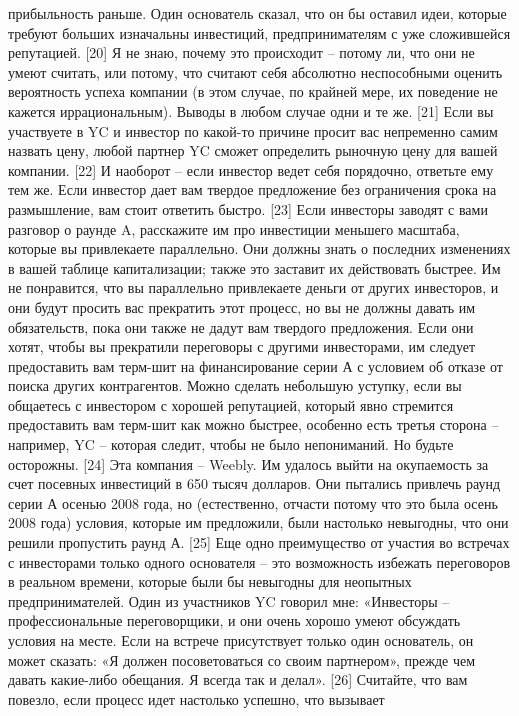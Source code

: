 \documentclass[ebook,12pt,oneside,openany]{memoir}
\begin{document}
прибыльность раньше. Один основатель сказал, что он бы оставил идеи,
которые требуют больших изначальны инвестиций, предпринимателям с уже
сложившейся репутацией. [20] Я не знаю, почему это происходит – потому
ли, что они не умеют считать, или потому, что считают себя абсолютно
неспособными оценить вероятность успеха компании (в этом случае, по
крайней мере, их поведение не кажется иррациональным). Выводы в любом
случае одни и те же. [21] Если вы участвуете в YC и инвестор по
какой-то причине просит вас непременно самим назвать цену, любой
партнер YC сможет определить рыночную цену для вашей компании. [22] И
наоборот – если инвестор ведет себя порядочно, ответьте ему тем же.
Если инвестор дает вам твердое предложение без ограничения срока на
размышление, вам стоит ответить быстро. [23] Если инвесторы заводят с
вами разговор о раунде A, расскажите им про инвестиции меньшего
масштаба, которые вы привлекаете параллельно. Они должны знать о
последних изменениях в вашей таблице капитализации; также это заставит
их действовать быстрее. Им не понравится, что вы параллельно
привлекаете деньги от других инвесторов, и они будут просить вас
прекратить этот процесс, но вы не должны давать им обязательств, пока
они также не дадут вам твердого предложения. Если они хотят, чтобы вы
прекратили переговоры с другими инвесторами, им следует предоставить
вам терм-шит на финансирование серии А с условием об отказе от поиска
других контрагентов. Можно сделать небольшую уступку, если вы
общаетесь с инвестором с хорошей репутацией, который явно стремится
предоставить вам терм-шит как можно быстрее, особенно есть третья
сторона – например, YC – которая следит, чтобы не было непониманий. Но
будьте осторожны. [24] Эта компания – Weebly. Им удалось выйти на
окупаемость за счет посевных инвестиций в 650 тысяч долларов. Они
пытались привлечь раунд серии А осенью 2008 года, но (естественно,
отчасти потому что это была осень 2008 года) условия, которые им
предложили, были настолько невыгодны, что они решили пропустить раунд
А. [25] Еще одно преимущество от участия во встречах с инвесторами
только одного основателя – это возможность избежать переговоров в
реальном времени, которые были бы невыгодны для неопытных
предпринимателей. Один из участников YC говорил мне: «Инвесторы –
профессиональные переговорщики, и они очень хорошо умеют обсуждать
условия на месте. Если на встрече присутствует только один основатель,
он может сказать: «Я должен посоветоваться со своим партнером», прежде
чем давать какие-либо обещания. Я всегда так и делал». [26] Считайте,
что вам повезло, если процесс идет настолько успешно, что вызывает
\end{document}
